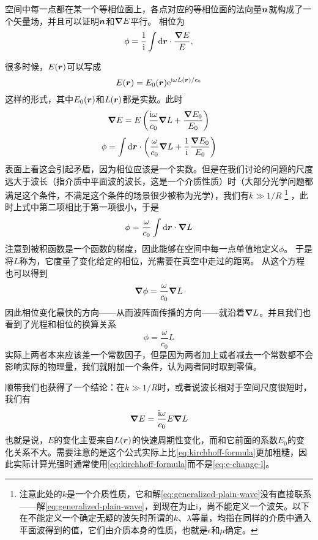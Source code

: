 空间中每一点都在某一个等相位面上，各点对应的等相位面的法向量$\vb*{n}$就构成了一个矢量场，并且可以证明$\vb*{n}$和$\grad{E}$平行。
相位为
\[
    \phi = \frac{1}{\mathrm{i}} \int \dd{\vb*{r}} \cdot \frac{\grad{E}}{E},
\]

很多时候，$E(\vb*{r})$可以写成
\begin{equation}
    E(\vb*{r}) = E_0(\vb*{r})\mathrm{e}^{\mathrm{i} \omega L(\vb*{r}) / c_0}
    \label{eq:generalized-plain-wave}
\end{equation}
这样的形式，其中$E_0(\vb*{r})$和$L(\vb*{r})$都是实数。此时
\[
    \grad{E} = E \left(\frac{\mathrm{i} \omega}{c_0} \grad{L} + \frac{\grad{E_0}}{E_0}\right)
\]
\[
    \phi = \int \dd{\vb*{r}} \cdot \left( \frac{\omega}{c_0} \grad{L} + \frac{1}{\mathrm{i}} \frac{\grad{E_0}}{E_0} \right) 
\]
表面上看这会引起矛盾，因为相位应该是一个实数。但是在我们讨论的问题的尺度远大于波长（指介质中平面波的波长，这是一个介质性质）时（大部分光学问题都满足这个条件，不满足这个条件的场景很少被称为光学），我们有$k \gg 1/R$%
\footnote{注意此处的$k$是一个介质性质，它和解\eqref{eq:generalized-plain-wave}没有直接联系——解\eqref{eq:generalized-plain-wave}，到现在为止i，尚不能定义一个波矢。以下在不能定义一个确定无疑的波矢时所谓的$k$、$\lambda$等量，均指在同样的介质中通入平面波得到的值，它们由介质本身的性质，也就是$\epsilon$和$\mu$确定。}
，此时上式中第二项相比于第一项很小，于是
\begin{equation}
    \phi = \frac{\omega}{c_0} \int \dd{\vb*{r}} \cdot \grad{L}
    \label{eq:phrase-change}
\end{equation}
注意到被积函数是一个函数的梯度，因此能够在空间中每一点单值地定义$\phi$。
于是将$L$称为，它度量了变化给定的相位，光需要在真空中走过的距离。
从这个方程也可以得到
\[
    \grad{\phi} = \frac{\omega}{c_0} \grad{L}
\]
因此相位变化最快的方向——从而波阵面传播的方向——就沿着$\grad{L}$。并且我们也看到了光程和相位的换算关系
\begin{equation}
    \phi = \frac{\omega}{c_0} L
\end{equation}
实际上两者本来应该差一个常数因子，但是因为两者加上或者减去一个常数都不会影响实际的物理量，我们就附加一个条件，认为两者同时取到零值。

顺带我们也获得了一个结论：在$k \gg 1/R$时，或者说波长相对于空间尺度很短时，我们有
\begin{equation}
    \grad{E} = \frac{\mathrm{i} \omega}{c_0} E \grad{L}
    \label{eq:e-change-l}
\end{equation}
也就是说，$E$的变化主要来自$L(\vb*{r})$的快速周期性变化，而和它前面的系数$E_0$的变化关系不大。需要注意的是这个公式实际上比\eqref{eq:kirchhoff-formula}更加粗糙，因此实际计算光强时通常使用\eqref{eq:kirchhoff-formula}而不是\eqref{eq:e-change-l}。

